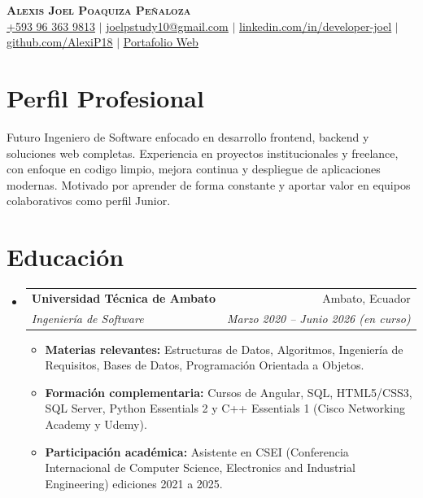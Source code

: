 \documentclass[letterpaper,11pt]{article}
\makeatletter
\newcommand{\resumeItem}[1]{
  \item\small{
    {#1 \vspace{-2pt}}
  }
}
\newcommand{\resumeSubheading}[4]{
  \vspace{-2pt}\item
    \begin{tabular*}{0.97\textwidth}[t]{l@{\extracolsep{\fill}}r}
      \textbf{#1} & #2 \\
      \textit{\small#3} & \textit{\small #4} \\
    \end{tabular*}\vspace{-7pt}
}
\newcommand{\resumeSubHeadingListStart}{\begin{itemize}[leftmargin=0.15in, label={}]}
\newcommand{\resumeSubHeadingListEnd}{\end{itemize}}
\newcommand{\resumeItemListStart}{\begin{itemize}}
\newcommand{\resumeItemListEnd}{\end{itemize}\vspace{-5pt}}
\makeatother
\begin{document}
\begin{center}
    \textbf{\Huge \scshape Alexis Joel Poaquiza Peñaloza} \\ \vspace{5pt}
    \small \href{https://wa.link/gqwair}{\underline{+593 96 363 9813}} $|$
    \href{mailto:joelpstudy10@gmail.com}{\underline{joelpstudy10@gmail.com}} $|$ 
    \href{https://www.linkedin.com/in/developer-joel/}{\underline{linkedin.com/in/developer-joel}} $|$
    \href{https://github.com/AlexiP18}{\underline{github.com/AlexiP18}} $|$
    \href{https://portafolio-personal-blue-phi.vercel.app/}{\underline{Portafolio Web}}
\end{center}

\section{Perfil Profesional}
  \small{Futuro Ingeniero de Software enfocado en desarrollo frontend, backend y soluciones web completas. Experiencia en proyectos institucionales y freelance, con enfoque en codigo limpio, mejora continua y despliegue de aplicaciones modernas. Motivado por aprender de forma constante y aportar valor en equipos colaborativos como perfil Junior.}

\section{Educación}
  \resumeSubHeadingListStart
    \resumeSubheading
      {Universidad Técnica de Ambato}{Ambato, Ecuador}
      {Ingeniería de Software}{Marzo 2020 -- Junio 2026 (en curso)}
      \resumeItemListStart
        \resumeItem{\textbf{Materias relevantes:} Estructuras de Datos, Algoritmos, Ingeniería de Requisitos, Bases de Datos, Programación Orientada a Objetos.}
        \resumeItem{\textbf{Formación complementaria:} Cursos de Angular, SQL, HTML5/CSS3, SQL Server, Python Essentials 2 y C++ Essentials 1 (Cisco Networking Academy y Udemy).}
        \resumeItem{\textbf{Participación académica:} Asistente en CSEI (Conferencia Internacional de Computer Science, Electronics and Industrial Engineering) ediciones 2021 a 2025.}
      \resumeItemListEnd
  \resumeSubHeadingListEnd

\end{document}
